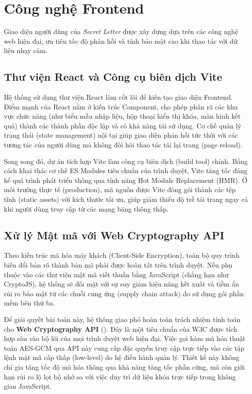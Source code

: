 \section{Công nghệ Frontend}

Giao diện người dùng của \textit{Secret Letter} được xây dựng dựa trên các công nghệ web hiện đại, ưu tiên tốc độ phản hồi và tính bảo mật cao khi thao tác với dữ liệu nhạy cảm.

\subsection{Thư viện React và Công cụ biên dịch Vite}
Hệ thống sử dụng thư viện React làm cốt lõi để kiến tạo giao diện Frontend. Điểm mạnh của React nằm ở kiến trúc Component, cho phép phân rã các khu vực chức năng (như biểu mẫu nhập liệu, hộp thoại hiển thị khóa, màn hình kết quả) thành các thành phần độc lập và có khả năng tái sử dụng. Cơ chế quản lý trạng thái (state management) nội tại giúp giao diện phản hồi tức thời với các tương tác của người dùng mà không đòi hỏi thao tác tải lại trang (page reload).

Song song đó, dự án tích hợp Vite làm công cụ biên dịch (build tool) chính. Bằng cách khai thác cơ chế ES Modules tiêu chuẩn của trình duyệt, Vite tăng tốc đáng kể quá trình phát triển thông qua tính năng Hot Module Replacement (HMR). Ở môi trường thực tế (production), mã nguồn được Vite đóng gói thành các tệp tĩnh (static assets) với kích thước tối ưu, giúp giảm thiểu độ trễ tải trang ngay cả khi người dùng truy cập từ các mạng băng thông thấp.

\subsection{Xử lý Mật mã với Web Cryptography API}
Theo kiến trúc mã hóa máy khách (Client-Side Encryption), toàn bộ quy trình biến đổi bản rõ thành bản mã phải được hoàn tất trên trình duyệt. Nếu phụ thuộc vào các thư viện mật mã viết thuần bằng JavaScript (chẳng hạn như CryptoJS), hệ thống sẽ đối mặt với sự suy giảm hiệu năng kết xuất và tiềm ẩn rủi ro bảo mật từ các chuỗi cung ứng (supply chain attack) do sử dụng gói phần mềm bên thứ ba.

Để giải quyết bài toán này, hệ thống giao phó hoàn toàn trách nhiệm tính toán cho \textbf{Web Cryptography API} (\textcite{w3c-webcrypto}). Đây là một tiêu chuẩn của W3C được tích hợp sâu vào bộ lõi của mọi trình duyệt web hiện đại. Việc gọi hàm mã hóa thuật toán AES-GCM qua API này cung cấp đặc quyền truy cập trực tiếp vào các tập lệnh mật mã cấp thấp (low-level) do hệ điều hành quản lý. Thiết kế này không chỉ gia tăng tốc độ mã hóa thông qua khả năng tăng tốc phần cứng, mà còn giới hạn rủi ro lộ lọt bộ nhớ so với việc duy trì dữ liệu khóa trực tiếp trong không gian JavaScript.

